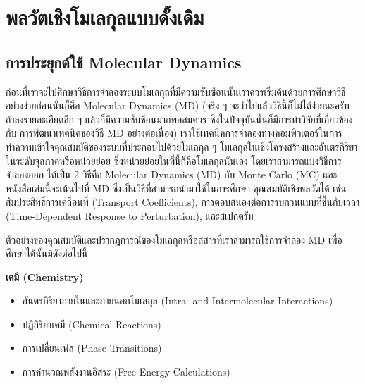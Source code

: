 

\chapter{พลวัตเชิงโมเลกุลแบบดั้งเดิม}
\label{ch:md}

\section{การประยุกต์ใช้ Molecular Dynamics}

ก่อนที่เราจะไปศึกษาวิธีการจำลองระบบโมเลกุลที่มีความซับซ้อนนั้นเราควรเริ่มต้นด้วยการศึกษาวิธีอย่างง่ายก่อนนั่นก็คือ Molecular Dynamics (MD)
(จริง ๆ จะว่าไปแล้ววิธีนี้ก็ไม่ได้ง่ายนะครับ ถ้าลงรายละเอียดลึก ๆ แล้วก็มีความซับซ้อนมากพอสมควร ซึ่งในปัจจุบันนั้นก็มีการทำวิจัยที่เกี่ยวข้องกับ%
การพัฒนาเทคนิคของวิธี MD อย่างต่อเนื่อง) เราใช้เทคนิคการจำลองทางคอมพิวเตอร์ในการทำความเข้าใจคุณสมบัติของระบบที่ประกอบไปด้วยโมเลกุล
ๆ โมเลกุลในเชิงโครงสร้างและอันตรกิริยาในระดับจุลภาคหรือหน่วยย่อย ซึ่งหน่วยย่อยในที่นี้ก็คือโมเลกุลนั่นเอง โดยเราสามารถแบ่งวิธีการจำลองออก%
ได้เป็น 2 วิธีคือ Molecular Dynamics (MD) กับ Monte Carlo (MC) และหนังสือเล่มนี้จะเน้นไปที่ MD ซึ่งเป็นวิธีที่สามารถนำมาใช้ในการศึกษา%
คุณสมบัติเชิงพลวัตได้ เช่น สัมประสิทธิ์การเคลื่อนที่ (Transport Coefficients), การตอบสนองต่อการรบกวนแบบที่ขึ้นกับเวลา 
(Time-Dependent Response to Perturbation), และสเปกตรัม

ตัวอย่างของคุณสมบัติและปรากฏการณ์ของโมเลกุลหรือสสารที่เราสามารถใช้การจำลอง MD เพื่อศึกษาได้นั้นมีดังต่อไปนี้

\noindent \textbf{เคมี (Chemistry)}

\begin{itemize}[topsep=0pt,noitemsep]
  \setlength\itemsep{0.5em}
  \item อันตรกิริยาภายในและภายนอกโมเลกุล (Intra- and Intermolecular Interactions)

  \item ปฏิกิริยาเคมี (Chemical Reactions)

  \item การเปลี่ยนเฟส (Phase Transitions)

  \item การคำนวณพลังงานอิสระ (Free Energy Calculations)
\end{itemize}


